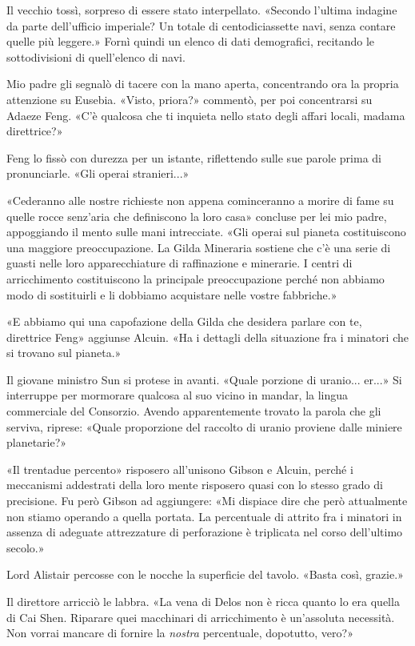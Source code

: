 Il vecchio tossì, sorpreso di essere stato interpellato. «Secondo
l'ultima indagine da parte dell'ufficio imperiale? Un totale di
centodiciassette navi, senza contare quelle più leggere.» Fornì quindi
un elenco di dati demografici, recitando le sottodivisioni di
quell'elenco di navi.

Mio padre gli segnalò di tacere con la mano aperta, concentrando ora la
propria attenzione su Eusebia. «Visto, priora?» commentò, per poi
concentrarsi su Adaeze Feng. «C'è qualcosa che ti inquieta nello stato
degli affari locali, madama direttrice?»

Feng lo fissò con durezza per un istante, riflettendo sulle sue parole
prima di pronunciarle. «Gli operai stranieri...»

«Cederanno alle nostre richieste non appena cominceranno a morire di
fame su quelle rocce senz'aria che definiscono la loro casa» concluse
per lei mio padre, appoggiando il mento sulle mani intrecciate. «Gli
operai sul pianeta costituiscono una maggiore preoccupazione. La Gilda
Mineraria sostiene che c'è una serie di guasti nelle loro
apparecchiature di raffinazione e minerarie. I centri di arricchimento
costituiscono la principale preoccupazione perché non abbiamo modo di
sostituirli e li dobbiamo acquistare nelle vostre fabbriche.»

«E abbiamo qui una capofazione della Gilda che desidera parlare con te,
direttrice Feng» aggiunse Alcuin. «Ha i dettagli della situazione fra i
minatori che si trovano sul pianeta.»

Il giovane ministro Sun si protese in avanti. «Quale porzione di
uranio... er...» Si interruppe per mormorare qualcosa al suo vicino in
mandar, la lingua commerciale del Consorzio. Avendo apparentemente
trovato la parola che gli serviva, riprese: «Quale proporzione del
raccolto di uranio proviene dalle miniere planetarie?»

«Il trentadue percento» risposero all'unisono Gibson e Alcuin, perché i
meccanismi addestrati della loro mente risposero quasi con lo stesso
grado di precisione. Fu però Gibson ad aggiungere: «Mi dispiace dire che
però attualmente non stiamo operando a quella portata. La percentuale di
attrito fra i minatori in assenza di adeguate attrezzature di
perforazione è triplicata nel corso dell'ultimo secolo.»

Lord Alistair percosse con le nocche la superficie del tavolo. «Basta
così, grazie.»

Il direttore arricciò le labbra. «La vena di Delos non è ricca quanto lo
era quella di Cai Shen. Riparare quei macchinari di arricchimento è
un'assoluta necessità. Non vorrai mancare di fornire la \emph{nostra}
percentuale, dopotutto, vero?»


